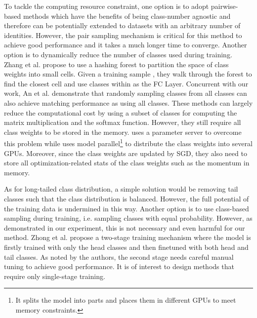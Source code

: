\documentclass[10pt,twocolumn,letterpaper]{article}
\begin{document}
To tackle the computing resource constraint, one option is to adopt pairwise-based methods which have the benefits of being class-number agnostic and therefore can be potentially extended to datasets with an arbitrary number of identities. However, the pair sampling mechanism is critical for this method to achieve good performance\cite{schroff2015facenet} and it takes a much longer time to converge.
Another option is to dynamically reduce the number of classes used during training. Zhang et al.\cite{zhang_accelerated_2018} propose to use a hashing forest to partition the space of class weights into small cells.
Given a training sample , they walk through the forest to find the closest cell and use classes within as the FC Layer. 
Concurrent with our work, An et al.\cite{an2020partial} demonstrate that 
randomly sampling classes from all classes can also achieve matching performance as using all classes. These methods can largely reduce the computational cost by using a subset of classes for computing the matrix multiplication and the softmax function. However, they still require all class weights to be stored in the memory. \cite{zhang_accelerated_2018} uses a parameter server to overcome this problem while \cite{an2020partial} uses model parallel\footnote{It splits the model into parts and places them in different GPUs to meet memory constraints.} to distribute the class weights into several GPUs. Moreover, since the class weights  are updated by SGD, they also need to store all optimization-related stats of the class weights such as the momentum in memory. 

As for long-tailed class distribution, a simple solution would be removing tail classes such that the class distribution is balanced. However, the full potential of the training data is undermined in this way. Another option is to use class-based sampling during training, i.e. sampling classes with equal probability\cite{chawla2002smote}. However, as demonstrated in our experiment, this is not necessary and even harmful for our method. Zhong et al.\cite{zhong_unequal-training_2019} propose a two-stage training mechanism where the model is firstly trained with only the head classes and then finetuned with both head and tail classes. As noted by the authors, the second stage needs careful manual tuning to achieve good performance. It is of interest to design methods that require only single-stage training. 
\end{document}
